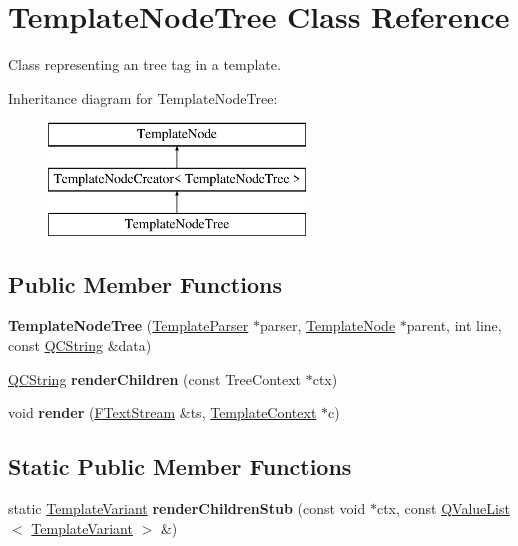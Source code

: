 \hypertarget{class_template_node_tree}{}\section{Template\+Node\+Tree Class Reference}
\label{class_template_node_tree}


Class representing an \textquotesingle{}tree\textquotesingle{} tag in a template.  


Inheritance diagram for Template\+Node\+Tree\+:\begin{figure}[H]
\begin{center}
\leavevmode
\includegraphics[height=3.000000cm]{class_template_node_tree}
\end{center}
\end{figure}
\subsection*{Public Member Functions}
\begin{DoxyCompactItemize}
\item 
\mbox{\label{class_template_node_tree_a7073702e447b60cf5163f0114330ae34}} 
{\bfseries Template\+Node\+Tree} (\mbox{\hyperlink{class_template_parser}{Template\+Parser}} $\ast$parser, \mbox{\hyperlink{class_template_node}{Template\+Node}} $\ast$parent, int line, const \mbox{\hyperlink{class_q_c_string}{Q\+C\+String}} \&data)
\item 
\mbox{\label{class_template_node_tree_a9e003555c8ce1065a8446e3a26b64888}} 
\mbox{\hyperlink{class_q_c_string}{Q\+C\+String}} {\bfseries render\+Children} (const Tree\+Context $\ast$ctx)
\item 
\mbox{\label{class_template_node_tree_a69eb441fb4be81adaab307cbfb158363}} 
void {\bfseries render} (\mbox{\hyperlink{class_f_text_stream}{F\+Text\+Stream}} \&ts, \mbox{\hyperlink{class_template_context}{Template\+Context}} $\ast$c)
\end{DoxyCompactItemize}
\subsection*{Static Public Member Functions}
\begin{DoxyCompactItemize}
\item 
\mbox{\label{class_template_node_tree_a6498efbb0c72959a78b55e54fd499d39}} 
static \mbox{\hyperlink{class_template_variant}{Template\+Variant}} {\bfseries render\+Children\+Stub} (const void $\ast$ctx, const \mbox{\hyperlink{class_q_value_list}{Q\+Value\+List}}$<$ \mbox{\hyperlink{class_template_variant}{Template\+Variant}} $>$ \&)
\end{DoxyCompactItemize}
